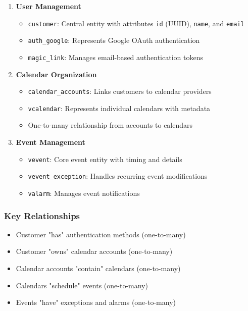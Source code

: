 \documentclass[12pt,a4paper,twoside]{report}
\begin{document}
\begin{enumerate}
    \item \textbf{User Management}
          \begin{itemize}
              \item \texttt{customer}: Central entity with attributes \texttt{id} (UUID), \texttt{name}, and \texttt{email}
              \item \texttt{auth\_google}: Represents Google OAuth authentication
              \item \texttt{magic\_link}: Manages email-based authentication tokens
          \end{itemize}

    \item \textbf{Calendar Organization}
          \begin{itemize}
              \item \texttt{calendar\_accounts}: Links customers to calendar providers
              \item \texttt{vcalendar}: Represents individual calendars with metadata
              \item One-to-many relationship from accounts to calendars
          \end{itemize}

    \item \textbf{Event Management}
          \begin{itemize}
              \item \texttt{vevent}: Core event entity with timing and details
              \item \texttt{vevent\_exception}: Handles recurring event modifications
              \item \texttt{valarm}: Manages event notifications
          \end{itemize}
\end{enumerate}

\subsubsection{Key Relationships}

\begin{itemize}
    \item Customer "has" authentication methods (one-to-many)
    \item Customer "owns" calendar accounts (one-to-many)
    \item Calendar accounts "contain" calendars (one-to-many)
    \item Calendars "schedule" events (one-to-many)
    \item Events "have" exceptions and alarms (one-to-many)
\end{itemize}
\end{document}
